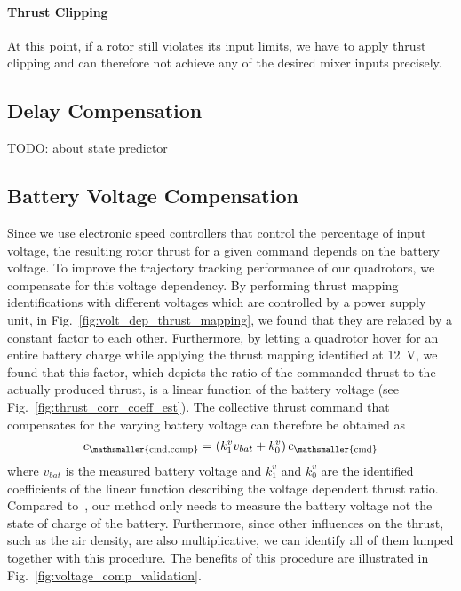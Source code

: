 \documentclass[10pt,a4paper,fleqn]{article}
\newcommand{\thrust}[0]{c} %
\newcommand{\mapcoeff}[2]{k_{#2}^{#1}}
\begin{document}
\paragraph{Thrust Clipping}

At this point, if a rotor still violates its input limits, we have to apply thrust clipping and can therefore not achieve any of the desired mixer inputs precisely.

\subsection{Delay Compensation}

TODO: about \href{https://github.com/uzh-rpg/rpg_quadrotor_common/tree/master/state_predictor}{state predictor}

\subsection{Battery Voltage Compensation} \label{sec:battery_voltage_compensation}

Since we use electronic speed controllers that control the percentage of input voltage, the resulting rotor thrust for a given command depends on the battery voltage.
To improve the trajectory tracking performance of our quadrotors, we compensate for this voltage dependency.
By performing thrust mapping identifications with different voltages which are controlled by a power supply unit, in Fig.~\ref{fig:volt_dep_thrust_mapping}, we found that they are related by a constant factor to each other.
Furthermore, by letting a quadrotor hover for an entire battery charge while applying the thrust mapping identified at \SI{12}{\volt}, we found that this factor, which depicts the ratio of the commanded thrust to the actually produced thrust, is a linear function of the battery voltage (see Fig.~\ref{fig:thrust_corr_coeff_est}).
The collective thrust command that compensates for the varying battery voltage can therefore be obtained as
%
\begin{equation}
	\thrust_{\mathsmaller{\mathrm{cmd,comp}}} = \left( \mapcoeff{v}{1} v_{bat} + \mapcoeff{v}{0} \right) \thrust_{\mathsmaller{\mathrm{cmd}}}
\end{equation}
%
where $v_{bat}$ is the measured battery voltage and $\mapcoeff{v}{1}$ and $\mapcoeff{v}{0}$ are the identified coefficients of the linear function describing the voltage dependent thrust ratio.
Compared to~\cite{Podhradsky13icuas}, our method only needs to measure the battery voltage not the state of charge of the battery.
Furthermore, since other influences on the thrust, such as the air density, are also multiplicative, we can identify all of them lumped together with this procedure.
The benefits of this procedure are illustrated in Fig.~\ref{fig:voltage_comp_validation}.
\end{document}
